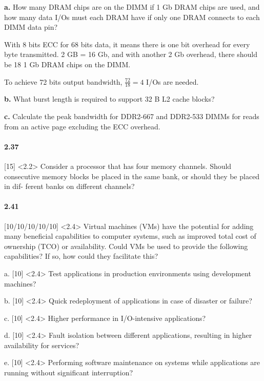 \documentclass{article}
\begin{document}
\textbf{a.} How many DRAM chips are on the DIMM if 1 Gb DRAM chips are used, and how many data I/Os must each DRAM have if only one DRAM connects to each DIMM data pin?

With 8 bits ECC for 68 bits data, it means there is one bit overhead for every byte transmitted. 2 GB = 16 Gb, and with another 2 Gb overhead, there should be 18 1 Gb DRAM chips on the DIMM.

To achieve 72 bits output bandwidth, $\frac{72}{18}=4$ I/Os are needed.



\textbf{b.} What burst length is required to support 32 B L2 cache blocks?

\textbf{c.} Calculate the peak bandwidth for DDR2-667 and DDR2-533 DIMMs for reads from an active page excluding the ECC overhead.

\paragraph{2.37} [15] <2.2> Consider a processor that has four memory channels. Should consecutive memory blocks be placed in the same bank, or should they be placed in dif- ferent banks on different channels?

\paragraph{2.41} [10/10/10/10/10] <2.4> Virtual machines (VMs) have the potential for adding many beneficial capabilities to computer systems, such as improved total cost of ownership (TCO) or availability. Could VMs be used to provide the following capabilities? If so, how could they facilitate this?

a. [10] <2.4> Test applications in production environments using development machines?

b. [10] <2.4> Quick redeployment of applications in case of disaster or failure?

c. [10] <2.4> Higher performance in I/O-intensive applications?

d. [10] <2.4> Fault isolation between different applications, resulting in higher availability for services?

e. [10] <2.4> Performing software maintenance on systems while applications are running without significant interruption?
\end{document}
